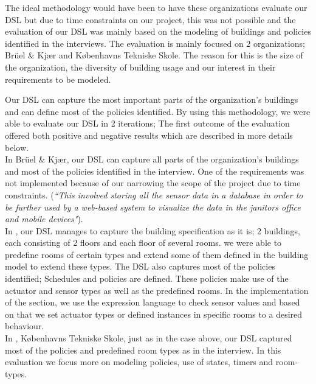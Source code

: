 The ideal methodology would have been to have these organizations evaluate our DSL but due to time constraints on our project, this was not possible and the evaluation of our DSL was mainly based on the modeling of buildings and policies identified in the interviews. The evaluation is mainly focused on 2 organizations; Br\"{u}el \& Kj\ae r and K\o benhavns Tekniske Skole. The reason for this is the size of the organization, the diversity of building usage and our interest in their requirements to be modeled. 

Our DSL can capture the most important parts of the organization's buildings and can define most of the policies identified. By using this methodology, we were able to evaluate our DSL in 2 iterations; The first outcome of the evaluation offered both positive and negative results which are described in more details below.\\

In Br\"{u}el \& Kj\ae r, our DSL can capture all parts of the organization's buildings and most of the policies identified in the interview. One of the requirements was not implemented because of our narrowing the scope of the project due to time constraints. (\textit{``This involved storing all the sensor data in a database in order to be further used by a web-based system to visualize the data in the janitors office and mobile devices"}).\\
In , our DSL manages to capture the building specification as it is; 2 buildings, each consisting of 2 floors and each floor of several rooms. we were able to predefine rooms of certain types and extend some of them defined in the building model to extend these types. The DSL also captures most of the policies identified; Schedules and policies are defined. These policies make use of the actuator and sensor types as well as the predefined rooms. In the implementation of the section, we use the expression language to check sensor values and based on that we set actuator types or defined instances in specific rooms to a desired behaviour. \\

In  , K\o benhavns Tekniske Skole, just as in the case above, our DSL captured most of the policies and predefined room types as in the interview. In this evaluation we focus more on modeling policies, use of states, timers and room-types.\\ 

